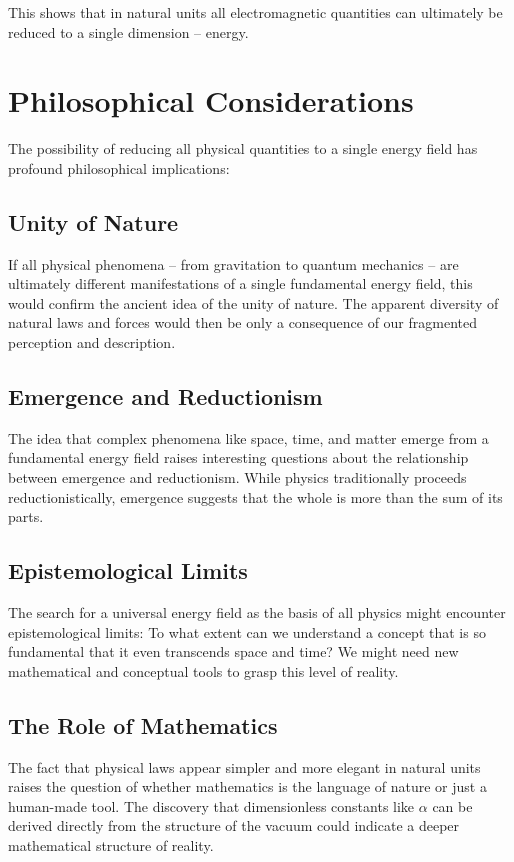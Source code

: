 \documentclass{article}
\begin{document}
This shows that in natural units all electromagnetic quantities can ultimately be reduced to a single dimension – energy.

\section{Philosophical Considerations}

The possibility of reducing all physical quantities to a single energy field has profound philosophical implications:

\subsection{Unity of Nature}

If all physical phenomena – from gravitation to quantum mechanics – are ultimately different manifestations of a single fundamental energy field, this would confirm the ancient idea of the unity of nature. The apparent diversity of natural laws and forces would then be only a consequence of our fragmented perception and description.

\subsection{Emergence and Reductionism}

The idea that complex phenomena like space, time, and matter emerge from a fundamental energy field raises interesting questions about the relationship between emergence and reductionism. While physics traditionally proceeds reductionistically, emergence suggests that the whole is more than the sum of its parts.

\subsection{Epistemological Limits}

The search for a universal energy field as the basis of all physics might encounter epistemological limits: To what extent can we understand a concept that is so fundamental that it even transcends space and time? We might need new mathematical and conceptual tools to grasp this level of reality.

\subsection{The Role of Mathematics}

The fact that physical laws appear simpler and more elegant in natural units raises the question of whether mathematics is the language of nature or just a human-made tool. The discovery that dimensionless constants like $\alpha$ can be derived directly from the structure of the vacuum could indicate a deeper mathematical structure of reality.
\end{document}
